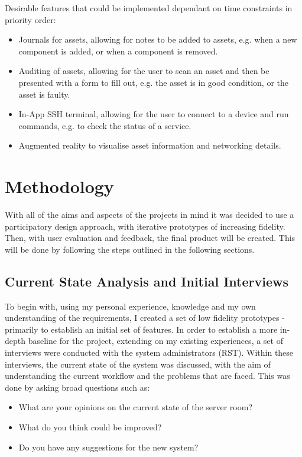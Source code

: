 \documentclass [11pt,a4paper]{article}
\begin{document}
Desirable features that could be implemented dependant on time constraints in priority order: 
\begin{itemize}
\item Journals for assets, allowing for notes to be added to assets, e.g. when a new component is added, or when a component is removed.

\item Auditing of assets, allowing for the user to scan an asset and then be presented with a form to fill out, e.g. the asset is in good condition, or the asset is faulty. 

\item In-App SSH terminal, allowing for the user to connect to a device and run commands, e.g. to check the status of a service.

\item Augmented reality to visualise asset information and networking details.
\end{itemize}

\section{Methodology}
\label{sec:methodology}
With all of the aims and aspects of the projects in mind it was decided to use a participatory design approach, with iterative prototypes of increasing fidelity. Then, with user evaluation and feedback, the final product will be created. This will be done by following the steps outlined in the following sections.

\subsection{Current State Analysis and Initial Interviews}
\label{sec:current_state_analysis}
To begin with, using my personal experience, knowledge and my own understanding of the requirements, I created a set of low fidelity prototypes - primarily to establish an initial set of features. In order to establish a more in-depth baseline for the project, extending on my existing experiences, a set of interviews were conducted with the system administrators (RST). Within these interviews, the current state of the system was discussed, with the aim of understanding the current workflow and the problems that are faced. This was done by asking broad questions such as:

\begin{itemize}
    \item What are your opinions on the current state of the server room?
    \item What do you think could be improved?
    \item Do you have any suggestions for the new system?
\end{itemize}
\end{document}
